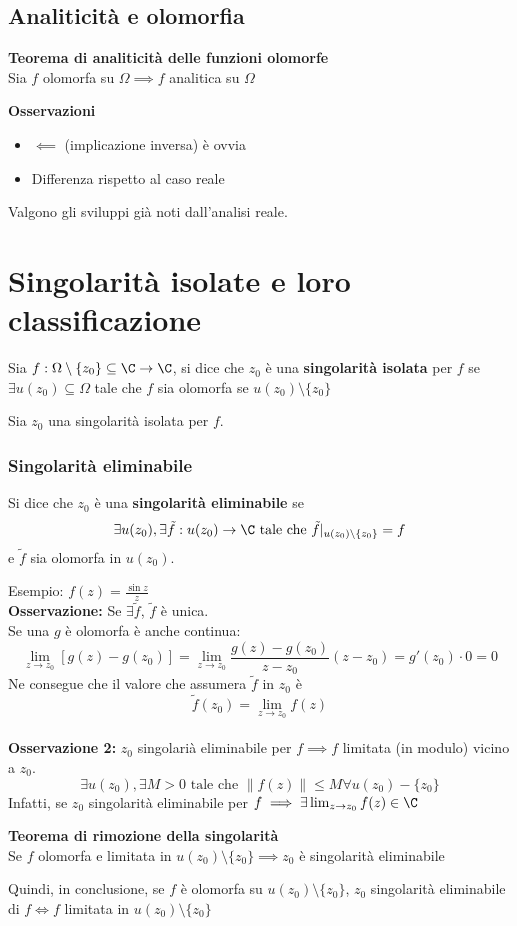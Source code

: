 \subsection{Analiticità e olomorfia}
\begin{tcolorbox}
	\textbf{Teorema di analiticità delle funzioni olomorfe}\\ 
	Sia $f$ olomorfa su $\Omega\implies f$ analitica su $\Omega$
\end{tcolorbox}
\textbf{Osservazioni}
\begin{itemize}
	\item $\impliedby $ (implicazione inversa) è ovvia
	\item Differenza rispetto al caso reale
\end{itemize}
Valgono gli sviluppi già noti dall'analisi reale.
\\

\section{Singolarità isolate e loro classificazione}	
\begin{tcolorbox}
	Sia $f:\Omega \setminus \{z_0\} \subseteq\C\to \C$, si dice che $z_0$ è una \textbf{singolarità isolata} per $f$ se $\exists u(z_0)\subseteq\Omega$ tale che $f$ sia olomorfa se $u(z_0)\setminus \{z_0\}$  
\end{tcolorbox}
Sia $z_0$ una singolarità isolata per $f$.
\subsubsection{Singolarità eliminabile}
\begin{tcolorbox}
Si dice che $z_0$ è una \textbf{singolarità eliminabile} se 
\[\exists u(z_0),\exists\tilde f:u(z_0)\to \C \text{ tale che }\tilde f|_{u(z_0)\setminus \{z_0\} }=f\]
e $\tilde f$ sia olomorfa in $u(z_0)$.
\end{tcolorbox}
Esempio: $f(z)= \frac{\sin z}{z}$
\\\textbf{Osservazione:} Se $\exists \tilde f$, $\tilde f$ è unica.
\\Se una $g$ è olomorfa è anche continua:
\[\lim_{z \to z_0} [g(z)-g(z_0)]=\lim_{z \to z_0} \frac{g(z)-g(z_0)}{z-z_0}(z-z_0)=g'(z_0)\cdot 0=0\]
Ne consegue che il valore che assumera $\tilde f$ in $z_0$ è 
\[\tilde f(z_0)=\lim_{z \to z_0} f(z)\]\\
\textbf{Osservazione 2:} $z_0$ singolarià eliminabile per $f\implies f$ limitata (in modulo) vicino a $z_0$.
\[\exists u(z_0), \exists M>0 \text{ tale che } \|f(z)\|\le M\forall u(z_0)-\{z_0\} \]
Infatti, se $z_0$ singolarità eliminabile per $f\implies \exists \lim_{z \to z_0} f(z)\in\C$
\begin{tcolorbox}
	\textbf{Teorema di rimozione della singolarità} 
	\\Se $f$ olomorfa e limitata in $u(z_0)\setminus \{z_0\} \implies z_0$ è singolarità eliminabile
\end{tcolorbox}
Quindi, in conclusione, se $f$ è olomorfa su $u(z_0)\setminus \{z_0\} $, $z_0$ singolarità eliminabile di $f \iff f$ limitata in $u(z_0)\setminus \{z_0\} $ 
